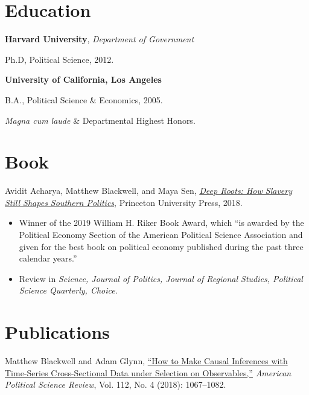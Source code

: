 \documentclass[margin,line,12pt]{res}
\newenvironment{list1}{
  \begin{list}{\ding{113}}{%
      \setlength{\itemsep}{0in}
      \setlength{\parsep}{0in} \setlength{\parskip}{0in}
      \setlength{\topsep}{0in} \setlength{\partopsep}{0in} 
      \setlength{\leftmargin}{0.83 cm}}}{\end{list}}
\begin{document}
\begin{resume}
\section{\sc Education}

{\bf Harvard University}, {\em Department of Government}
\begin{list1}
\item[] Ph.D, Political Science, 2012. 
\end{list1}
{\bf University of California, Los Angeles}
\begin{list1}
\item[] B.A., Political Science \& Economics, 2005.
\item[] \emph{Magna cum laude} \& Departmental Highest Honors.
\end{list1}

\section{\sc Book}

Avidit Acharya, Matthew Blackwell, and Maya Sen, \href{http://www.mattblackwell.org/deep-roots/}{\emph{Deep Roots: How Slavery Still Shapes Southern Politics}}, Princeton University Press, 2018.
\begin{itemize} 
\item Winner of the 2019 William H. Riker Book Award, which ``is awarded by the Political Economy Section of the American Political Science Association and given for the best book on political economy published during the past three calendar years.''
\item Review in \emph{Science, Journal of Politics, Journal of Regional Studies, Political Science Quarterly, Choice}.
\end{itemize}

\section{\sc Publications}

Matthew Blackwell and Adam Glynn, \href{http://www.mattblackwell.org/files/papers/causal-tscs.pdf}{``How to Make Causal Inferences with Time-Series
  Cross-Sectional Data under Selection on Observables,''} \emph{American Political Science Review}, Vol. 112, No. 4 (2018): 1067--1082.


\end{resume}
\end{document}
